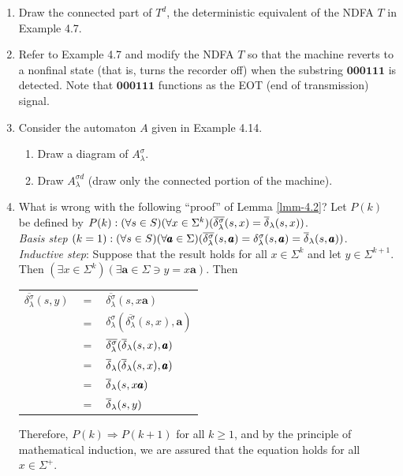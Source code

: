 \begin{enumerate}[{4.}1.]
\item Draw the connected part of $T^d$, the deterministic equivalent of the NDFA
$T$ in Example 4.7.

\item Refer to Example 4.7 and modify the NDFA $T$ so that the machine reverts
to a nonfinal state (that is, turns the recorder off) when the substring
$\pmb{000111}$ is detected. Note that $\pmb{000111}$ functions as the EOT (end
of transmission) signal.

\item Consider the automaton $A$ given in Example 4.14.
\begin{enumerate}
\item Draw a diagram of $A^{\sigma}_{\lambda}$.
\item Draw $A^{\sigma d}_{\lambda}$ (draw only the connected portion of the
machine).
\end{enumerate}

\item What is wrong with the following ``proof'' of Lemma \ref{lmm-4.2}? Let $P(k)$ be
defined by $P(k): (\forall s \in S)(\forall x \in \Sigma^k)
(\overline{\delta^{\sigma}_{\lambda}}(s,x)=\overline{\delta}_{\lambda}(s,x))$. \\
\emph{Basis step} $(k = 1): (\forall s \in S)(\forall\pmb{a}\in\Sigma)
(\overline{\delta^{\sigma}_{\lambda}}(s,\pmb{a})=\delta^{\sigma}_{\lambda}(s,\pmb{a}) =
\overline{\delta}_{\lambda}(s,\pmb{a}))$. \\
\emph{Inductive step}: Suppose that the result holds for all $x \in \Sigma^k$
and let $y \in \Sigma^{k+1}$. Then $(\exists x \in \Sigma^k)(\exists \pmb{a} \in
\Sigma \ni y = x\pmb{a})$. Then
\begin{center}\begin{tabular}{rcl}
$\overline{\delta^{\sigma}_{\lambda}}(s,y)$ & $=$ & $\overline{\delta^{\sigma}_{\lambda}}(s,x\pmb{a})$\\
& $=$ & $\delta^{\sigma}_{\lambda}(\overline{\delta^{\sigma}_{\lambda}}(s,x),\pmb{a})$ \\
& $=$ & $\overline{\delta^{\sigma}_{\lambda}}(\overline{\delta}_{\lambda}(s,x),\pmb{a})$ \\
& $=$ & $\overline{\delta}_{\lambda}(\overline{\delta}_{\lambda}(s,x),\pmb{a})$ \\
& $=$ & $\overline{\delta}_{\lambda}(s,x\pmb{a})$ \\
& $=$ & $\overline{\delta}_{\lambda}(s,y)$
\end{tabular}\end{center}
Therefore, $P(k) \Rightarrow P(k + 1)$ for all $k \geq 1$, and by the principle
of mathematical induction, we are assured that the equation holds for all
$x \in \Sigma^+$.


\end{enumerate}

